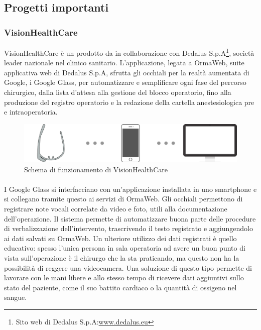   \subsection{Progetti importanti}
   \subsubsection{VisionHealthCare}
   VisionHealthCare è un  prodotto da \nomeAzienda{} in collaborazione con Dedalus S.p.A\footnote{Sito web di Dedalus S.p.A:\@ \href{http://www.dedalus.eu}{www.dedalus.eu}}, società leader nazionale nel  clinico sanitario. L'applicazione, legata a OrmaWeb, suite applicativa web di Dedalus S.p.A, sfrutta gli occhiali per la realtà aumentata di Google, i Google Glass, per automatizzare e semplificare ogni fase del percorso chirurgico, dalla lista d'attesa alla gestione del blocco operatorio, fino alla produzione del registro operatorio e la redazione della cartella anestesiologica pre e intraoperatoria.
   \begin{figure}[H]
      \begin{center}
         \includegraphics[width=15cm,keepaspectratio]{immagini/visionhealthcare-schema}
      \end{center}
      \caption{Schema di funzionamento di VisionHealthCare}\label{schemavisionhealthcare}
   \end{figure}
   \paragraph*{} I Google Glass si interfacciano con un'applicazione installata in uno smartphone e si collegano tramite questo ai servizi di OrmaWeb.
   Gli occhiali permettono di registrare note vocali correlate da video e foto, utili alla documentazione dell'operazione. Il sistema permette di automatizzare buona parte delle procedure di verbalizzazione dell'intervento, trascrivendo il testo registrato e aggiungendolo ai dati salvati su OrmaWeb. Un ulteriore utilizzo dei dati registrati è quello educativo: spesso l'unica persona in sala operatoria ad avere un buon punto di vista sull'operazione è il chirurgo che la sta praticando, ma questo non ha la possibilità di reggere una videocamera. Una soluzione di questo tipo permette di lavorare con le mani libere e allo stesso tempo di ricevere dati aggiuntivi sullo stato del paziente, come il suo battito cardiaco o la quantità di ossigeno nel sangue.

